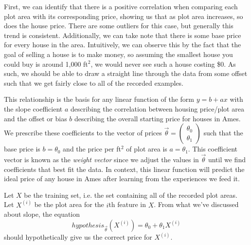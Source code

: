 First, we can identify that there is a positive correlation when comparing each
plot area with its corresponding price, showing us that as plot area increases,
so does the house price. There are some outliers for this case, but generally
this trend is consistent. Additionally, we can take note that there is some
base price for every house in the area. Intuitively, we can
observe this by the fact that the goal of selling a house is to make money, so
assuming the smallest house you could buy is around 1,000 ft$^2$, we would
never see such a house costing \$0. As such, we should be able to draw a
straight line through the data from some offset such that we get fairly close
to all of the recorded examples.

This relationship is the basis for any linear function of the form $y=b + ax$
with the slope coefficient $a$ describing the correlation between housing
price/plot area and the offset or bias $b$ describing the overall starting price for
houses in Ames. We prescribe these coefficients to the vector of prices $\vec\theta
= \begin{pmatrix}\theta_0 \\ \theta_1\end{pmatrix}$ such that the base price is
$b = \theta_0$ and the price per ft$^2$ of plot area is $a=\theta_1$. This
coefficient vector is known as the \emph{weight vector} since we adjust the
values in $\vec\theta$ until we find coefficients that best fit the data. In
context, this linear function will predict the ideal price of any house in
Ames after learning from the experiences we feed it.

Let $X$ be the training set, i.e. the set containing all of the
recorded plot areas. Let $X^{(i)}$ be the plot area for the $i$th feature in
$X$. From what we've discussed about slope, the equation
\begin{equation}
    hypothesis_{\vec\theta}(X^{(i)}) = \theta_0 + \theta_1X^{(i)}
\end{equation}
should hypothetically give us the correct price for $X^{(i)}$.

